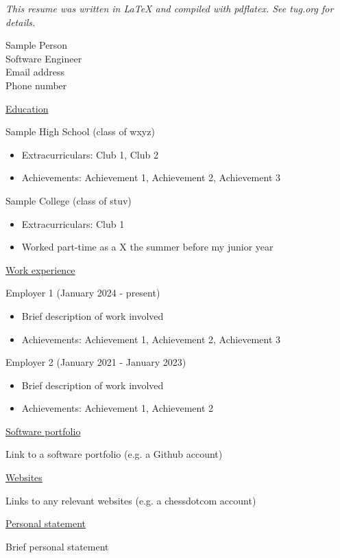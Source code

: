 \documentclass{article}
\begin{document}
\raggedright
\textit{{\small This resume was written in LaTeX and compiled with pdflatex. See tug.org for details.}}

{\small Sample Person \\
Software Engineer \\
Email address \\
Phone number}

\underline{Education}

Sample High School (class of wxyz)
\begin{itemize}
\item Extracurriculars: Club 1, Club 2
\item Achievements: Achievement 1, Achievement 2, Achievement 3
\end{itemize}

Sample College (class of stuv)
\begin{itemize}
\item Extracurriculars: Club 1
\item Worked part-time as a X the summer before my junior year
\end{itemize}

\underline{Work experience}

Employer 1 (January 2024 - present)
\begin{itemize}
\item Brief description of work involved
\item Achievements: Achievement 1, Achievement 2, Achievement 3
\end{itemize}

Employer 2 (January 2021 - January 2023)
\begin{itemize}
\item Brief description of work involved
\item Achievements: Achievement 1, Achievement 2
\end{itemize}

\underline{Software portfolio}

Link to a software portfolio (e.g. a Github account)

\underline{Websites}

Links to any relevant websites (e.g. a chessdotcom account)

\underline{Personal statement}

Brief personal statement
\end{document}
